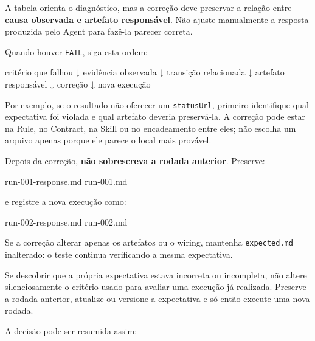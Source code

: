 \documentclass[
  10pt,
  a4paper,
  oneside]{book}
\newenvironment{Shaded}{}{}
\newcommand{\NormalTok}[1]{#1}
\renewenvironment{Shaded}{\begin{snugshade}}{\end{snugshade}}%
\begin{document}
A tabela orienta o diagnóstico, mas a correção deve preservar a relação
entre \textbf{causa observada e artefato responsável}. Não ajuste
manualmente a resposta produzida pelo Agent para fazê-la parecer
correta.

Quando houver \texttt{FAIL}, siga esta ordem:

\begin{Shaded}
\begin{Highlighting}[]
\NormalTok{critério que falhou}
\NormalTok{        ↓}
\NormalTok{evidência observada}
\NormalTok{        ↓}
\NormalTok{transição relacionada}
\NormalTok{        ↓}
\NormalTok{artefato responsável}
\NormalTok{        ↓}
\NormalTok{correção}
\NormalTok{        ↓}
\NormalTok{nova execução}
\end{Highlighting}
\end{Shaded}

Por exemplo, se o resultado não oferecer um \texttt{statusUrl}, primeiro
identifique qual expectativa foi violada e qual artefato deveria
preservá-la. A correção pode estar na Rule, no Contract, na Skill ou no
encadeamento entre eles; não escolha um arquivo apenas porque ele parece
o local mais provável.

Depois da correção, \textbf{não sobrescreva a rodada anterior}.
Preserve:

\begin{Shaded}
\begin{Highlighting}[]
\NormalTok{run{-}001{-}response.md}
\NormalTok{run{-}001.md}
\end{Highlighting}
\end{Shaded}

e registre a nova execução como:

\begin{Shaded}
\begin{Highlighting}[]
\NormalTok{run{-}002{-}response.md}
\NormalTok{run{-}002.md}
\end{Highlighting}
\end{Shaded}

Se a correção alterar apenas os artefatos ou o wiring, mantenha
\texttt{expected.md} inalterado: o teste continua verificando a mesma
expectativa.

Se descobrir que a própria expectativa estava incorreta ou incompleta,
não altere silenciosamente o critério usado para avaliar uma execução já
realizada. Preserve a rodada anterior, atualize ou versione a
expectativa e só então execute uma nova rodada.

A decisão pode ser resumida assim:
\end{document}
